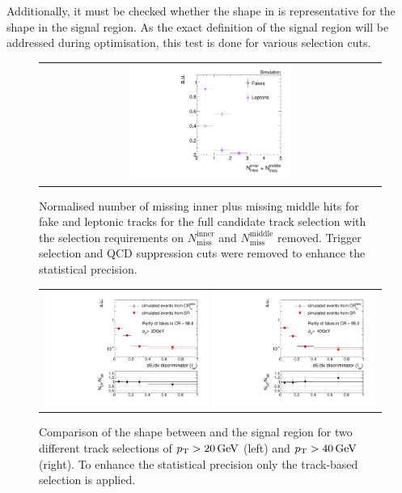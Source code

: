 Additionally, it must be checked whether the \ias shape in \fakeCR is representative for the \ias shape in the signal region.
As the exact definition of the signal region will be addressed during optimisation, this test is done for various \pt selection cuts.
\begin{figure}[!b]
  \centering 
  \begin{tabular}{c}
    \includegraphics[width=0.49\textwidth]{figures/analysis/Background/NLostInnerPlusMiddleForAllBkg_chiTracksfullSelectionNoQCDCutsNoTrigger.pdf}
  \end{tabular}
  \caption{Normalised number of missing inner plus missing middle hits for fake and leptonic tracks for the full candidate track selection with the selection requirements on $N_{\text{miss}}^{\text{inner}}$ and $N_{\text{miss}}^{\text{middle}}$ removed. Trigger selection and QCD suppression cuts were removed to enhance the statistical precision.}
  \label{fig:NMissInnerAndMiddle}
\end{figure}
\begin{figure}[!b]
  \centering 
\vspace{40pt}
  \begin{tabular}{c}
    \includegraphics[width=0.49\textwidth]{figures/analysis/Background/hASmi_fakes_ECalaoLe5_trackPtGt20.pdf}
    \includegraphics[width=0.49\textwidth]{figures/analysis/Background/hASmi_fakes_ECalaoLe5_trackPtGt40.pdf}
  \end{tabular}
  \caption{Comparison of the \ias shape between \fakeCR and the signal region for two different track \pt selections of $p_{\text{T}}>20\,\text{Ge}\kern-0.06667em\text{V}$ (left) and $p_{\text{T}}>40\,\text{Ge}\kern-0.06667em\text{V}$ (right). 
           To enhance the statistical precision only the track-based selection is applied.}
  \label{fig:IasSRCRFakes}
\end{figure}



